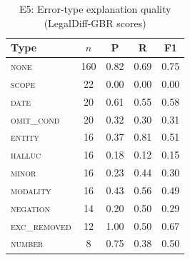 \begin{table}[t]
\caption{E5: Error-type explanation quality (LegalDiff-GBR scores)}\label{tab:explain}
\centering\footnotesize
\begin{tabular}{@{}lcccc@{}}
\toprule
Type & $n$ & P & R & F1\\
\midrule
\textsc{none} & 160 & 0.82 & 0.69 & 0.75 \\
\textsc{scope} & 22 & 0.00 & 0.00 & 0.00 \\
\textsc{date} & 20 & 0.61 & 0.55 & 0.58 \\
\textsc{omit\_cond} & 20 & 0.32 & 0.30 & 0.31 \\
\textsc{entity} & 16 & 0.37 & 0.81 & 0.51 \\
\textsc{halluc} & 16 & 0.18 & 0.12 & 0.15 \\
\textsc{minor} & 16 & 0.23 & 0.44 & 0.30 \\
\textsc{modality} & 16 & 0.43 & 0.56 & 0.49 \\
\textsc{negation} & 14 & 0.20 & 0.50 & 0.29 \\
\textsc{exc\_removed} & 12 & 1.00 & 0.50 & 0.67 \\
\textsc{number} & 8 & 0.75 & 0.38 & 0.50 \\
\bottomrule
\end{tabular}
\end{table}

